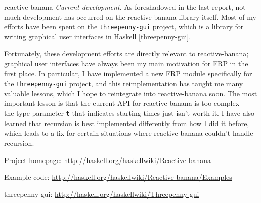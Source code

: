 \begin{hcarentry}[updated]{reactive-banana}
\emph{Current development.}
As foreshadowed in the last report, not much development has occurred on the reactive-banana library itself. Most of my efforts have been spent on the \verb`threepenny-gui` project, which is a library for writing graphical user interfaces in Haskell \cref{threepenny-gui}.

Fortunately, these development efforts are directly relevant to reactive-banana; graphical user interfaces have always been my main motivation for FRP in the first place. In particular, I have implemented a new FRP module specifically for the \verb`threepenny-gui` project, and this reimplementation has taught me many valuable lessons, which I hope to reintegrate into reactive-banana soon. The most important lesson is that the current API for reactive-banana is too complex --- the type parameter \verb!t! that indicates starting times just isn't worth it. I have also learned that recursion is best implemented differently from how I did it before, which leads to a fix for certain situations where reactive-banana couldn't handle recursion.

\FurtherReading
\begin{compactitem}
\item Project homepage: \url{http://haskell.org/haskellwiki/Reactive-banana}
\item Example code: \url{http://haskell.org/haskellwiki/Reactive-banana/Examples}
\item threepenny-gui: \url{http://haskell.org/haskellwiki/Threepenny-gui}
\end{compactitem}
\end{hcarentry}
